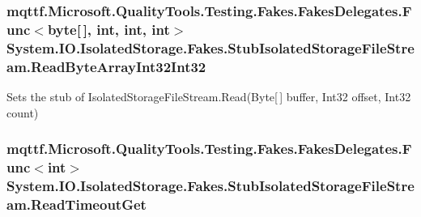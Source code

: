 \hypertarget{class_system_1_1_i_o_1_1_isolated_storage_1_1_fakes_1_1_stub_isolated_storage_file_stream_a4f8fa98e957c2cd06d8fa10b0e625a74}{
\subsubsection[{Read\-Byte\-Array\-Int32\-Int32}]{\setlength{\rightskip}{0pt plus 5cm}mqttf.\-Microsoft.\-Quality\-Tools.\-Testing.\-Fakes.\-Fakes\-Delegates.\-Func$<$byte\mbox{[}$\,$\mbox{]}, int, int, int$>$ System.\-I\-O.\-Isolated\-Storage.\-Fakes.\-Stub\-Isolated\-Storage\-File\-Stream.\-Read\-Byte\-Array\-Int32\-Int32}}\label{class_system_1_1_i_o_1_1_isolated_storage_1_1_fakes_1_1_stub_isolated_storage_file_stream_a4f8fa98e957c2cd06d8fa10b0e625a74}


Sets the stub of Isolated\-Storage\-File\-Stream.\-Read(\-Byte\mbox{[}$\,$\mbox{]} buffer, Int32 offset, Int32 count)

\hypertarget{class_system_1_1_i_o_1_1_isolated_storage_1_1_fakes_1_1_stub_isolated_storage_file_stream_af9d18707fef53a1c382ce7f635f6d0fe}{
\subsubsection[{Read\-Timeout\-Get}]{\setlength{\rightskip}{0pt plus 5cm}mqttf.\-Microsoft.\-Quality\-Tools.\-Testing.\-Fakes.\-Fakes\-Delegates.\-Func$<$int$>$ System.\-I\-O.\-Isolated\-Storage.\-Fakes.\-Stub\-Isolated\-Storage\-File\-Stream.\-Read\-Timeout\-Get}}\label{class_system_1_1_i_o_1_1_isolated_storage_1_1_fakes_1_1_stub_isolated_storage_file_stream_af9d18707fef53a1c382ce7f635f6d0fe}


